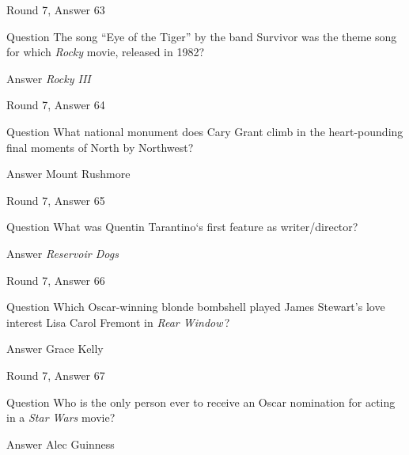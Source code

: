 \documentclass[11pt]{beamer}
\begin{document}
\begin{frame}[t]{Round 7, Answer 63}
\vspace{2em}
\begin{block}{Question}
The song ``Eye of the Tiger'' by the band Survivor was the theme song for which \emph{Rocky} movie, released in 1982?
\end{block}
\pause{}
\begin{block}{Answer}
\emph{Rocky III}
\end{block}
\end{frame}
    

\begin{frame}[t]{Round 7, Answer 64}
\vspace{2em}
\begin{block}{Question}
What national monument does Cary Grant climb in the heart-pounding final moments of North by Northwest?
\end{block}
\pause{}
\begin{block}{Answer}
Mount Rushmore
\end{block}
\end{frame}
    

\begin{frame}[t]{Round 7, Answer 65}
\vspace{2em}
\begin{block}{Question}
What was Quentin Tarantino`s first feature as writer/director?
\end{block}
\pause{}
\begin{block}{Answer}
\emph{Reservoir Dogs}
\end{block}
\end{frame}
    

\begin{frame}[t]{Round 7, Answer 66}
\vspace{2em}
\begin{block}{Question}
Which Oscar-winning blonde bombshell played James Stewart's love interest Lisa Carol Fremont in \emph{Rear Window}\,?
\end{block}
\pause{}
\begin{block}{Answer}
Grace Kelly
\end{block}
\end{frame}
    

\begin{frame}[t]{Round 7, Answer 67}
\vspace{2em}
\begin{block}{Question}
Who is the only person ever to receive an Oscar nomination for acting in a \emph{Star Wars} movie?
\end{block}
\pause{}
\begin{block}{Answer}
Alec Guinness
\end{block}
\end{frame}
    
\end{document}
